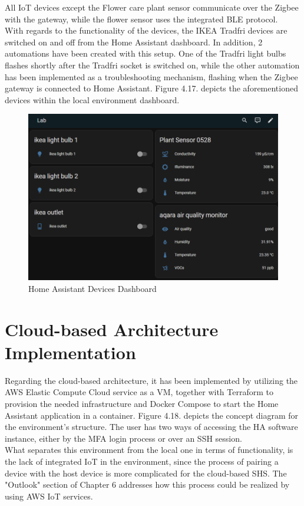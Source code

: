 All IoT devices except the Flower care plant sensor communicate over the Zigbee with the gateway, while the flower sensor uses the integrated BLE protocol.\\
With regards to the functionality of the devices, the IKEA Tradfri devices are switched on and off from the Home Assistant dashboard. In addition, 2 automations have been created with this setup. One of the Tradfri light bulbs flashes shortly after the Tradfri socket is switched on, while the other automation has been implemented as a troubleshooting mechanism, flashing when the Zigbee gateway is connected to Home Assistant. Figure 4.17. depicts the aforementioned devices within the local environment dashboard.
\begin{figure}[H]
	\centering
	\includegraphics[width=0.7 \linewidth]{Images/K4/ha-dashboard-2.png}
	\caption{Home Assistant Devices Dashboard}
	\label{fig:ha_dashboard}
\end{figure}

\section{Cloud-based Architecture Implementation}
Regarding the cloud-based architecture, it has been implemented by utilizing the AWS Elastic Compute Cloud service as a VM, together with Terraform to provision the needed infrastructure and Docker Compose to start the Home Assistant application in a container. Figure 4.18. depicts the concept diagram for the environment's structure.
The user has two ways of accessing the HA software instance, either by the MFA login process or over an SSH session.\\
What separates this environment from the local one in terms of functionality, is the lack of integrated IoT in the environment, since the process of pairing a device with the host device is more complicated for the cloud-based SHS. The "Outlook" section of Chapter 6 addresses how this process could be realized by using AWS IoT services.

